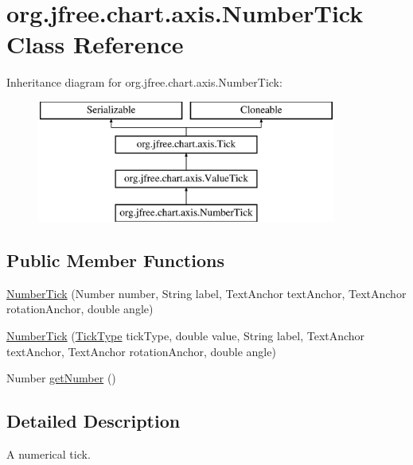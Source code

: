 \hypertarget{classorg_1_1jfree_1_1chart_1_1axis_1_1_number_tick}{}\section{org.\+jfree.\+chart.\+axis.\+Number\+Tick Class Reference}
\label{classorg_1_1jfree_1_1chart_1_1axis_1_1_number_tick}
Inheritance diagram for org.\+jfree.\+chart.\+axis.\+Number\+Tick\+:\begin{figure}[H]
\begin{center}
\leavevmode
\includegraphics[height=4.000000cm]{classorg_1_1jfree_1_1chart_1_1axis_1_1_number_tick}
\end{center}
\end{figure}
\subsection*{Public Member Functions}
\begin{DoxyCompactItemize}
\item 
\mbox{\hyperlink{classorg_1_1jfree_1_1chart_1_1axis_1_1_number_tick_a0afb333aca0fbdecde8866b4f856ca32}{Number\+Tick}} (Number number, String label, Text\+Anchor text\+Anchor, Text\+Anchor rotation\+Anchor, double angle)
\item 
\mbox{\hyperlink{classorg_1_1jfree_1_1chart_1_1axis_1_1_number_tick_a5a401db4294c9c1e334d532e5999a335}{Number\+Tick}} (\mbox{\hyperlink{classorg_1_1jfree_1_1chart_1_1axis_1_1_tick_type}{Tick\+Type}} tick\+Type, double value, String label, Text\+Anchor text\+Anchor, Text\+Anchor rotation\+Anchor, double angle)
\item 
Number \mbox{\hyperlink{classorg_1_1jfree_1_1chart_1_1axis_1_1_number_tick_a4c00ce5823f2cacf64bef48a58ed0378}{get\+Number}} ()
\end{DoxyCompactItemize}


\subsection{Detailed Description}
A numerical tick. 

